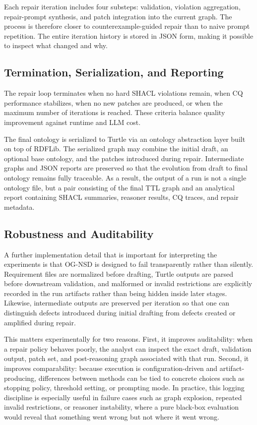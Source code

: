 Each repair iteration includes four substeps: validation, violation aggregation, repair-prompt synthesis, and patch integration into the current graph. The process is therefore closer to counterexample-guided repair than to naive prompt repetition. The entire iteration history is stored in JSON form, making it possible to inspect what changed and why.

\subsection{Termination, Serialization, and Reporting}
The repair loop terminates when no hard SHACL violations remain, when CQ performance stabilizes, when no new patches are produced, or when the maximum number of iterations is reached. These criteria balance quality improvement against runtime and LLM cost.

The final ontology is serialized to Turtle via an ontology abstraction layer built on top of RDFLib. The serialized graph may combine the initial draft, an optional base ontology, and the patches introduced during repair. Intermediate graphs and JSON reports are preserved so that the evolution from draft to final ontology remains fully traceable. As a result, the output of a run is not a single ontology file, but a pair consisting of the final TTL graph and an analytical report containing SHACL summaries, reasoner results, CQ traces, and repair metadata.

\subsection{Robustness and Auditability}
A further implementation detail that is important for interpreting the experiments is that OG-NSD is designed to fail transparently rather than silently. Requirement files are normalized before drafting, Turtle outputs are parsed before downstream validation, and malformed or invalid restrictions are explicitly recorded in the run artifacts rather than being hidden inside later stages. Likewise, intermediate outputs are preserved per iteration so that one can distinguish defects introduced during initial drafting from defects created or amplified during repair.

This matters experimentally for two reasons. First, it improves auditability: when a repair policy behaves poorly, the analyst can inspect the exact draft, validation output, patch set, and post-reasoning graph associated with that run. Second, it improves comparability: because execution is configuration-driven and artifact-producing, differences between methods can be tied to concrete choices such as stopping policy, threshold setting, or prompting mode. In practice, this logging discipline is especially useful in failure cases such as graph explosion, repeated invalid restrictions, or reasoner instability, where a pure black-box evaluation would reveal that something went wrong but not where it went wrong.

